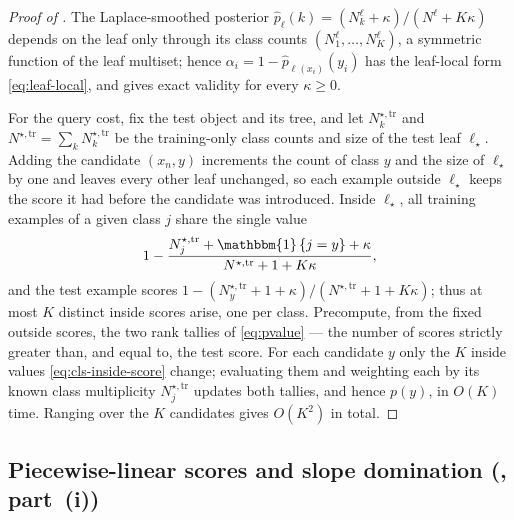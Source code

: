 \documentclass[twoside]{article}
\numberwithin{equation}{section}
\theoremstyle{plain}
\theoremstyle{definition}
\theoremstyle{remark}
\newcommand{\set}[1]{\left\{#1\right\}}
\begin{document}
\begin{proof}[Proof of ]
The Laplace-smoothed posterior $\widehat{p}_{\ell}(k) = (N_k^{\ell} + \kappa)/(N^{\ell} + K\kappa)$
depends on the leaf only through its class counts $(N_1^{\ell}, \dots, N_K^{\ell})$, a
symmetric function of the leaf multiset; hence $\alpha_i = 1 - \widehat{p}_{\ell(x_i)}(y_i)$
has the leaf-local form \eqref{eq:leaf-local}, and  gives exact
validity for every $\kappa \ge 0$.

For the query cost, fix the test object and its tree, and let $N_k^{\star,\mathrm{tr}}$ and
$N^{\star,\mathrm{tr}} = \sum_k N_k^{\star,\mathrm{tr}}$ be the training-only class counts
and size of the test leaf $\ell_\star$. Adding the candidate $(x_n, y)$ increments the
count of class $y$ and the size of $\ell_\star$ by one and leaves every other leaf
unchanged, so each example outside $\ell_\star$ keeps the score it had before the
candidate was introduced. Inside $\ell_\star$, all training examples of a given class $j$
share the single value
\begin{equation}\label{eq:cls-inside-score}
  1 - \frac{N_j^{\star,\mathrm{tr}} + \mathbbm{1}\set{j = y} + \kappa}
           {N^{\star,\mathrm{tr}} + 1 + K\kappa},
\end{equation}
and the test example scores $1 - (N_y^{\star,\mathrm{tr}} + 1 + \kappa)/(N^{\star,\mathrm{tr}} + 1 + K\kappa)$;
thus at most $K$ distinct inside scores arise, one per class. Precompute, from the fixed
outside scores, the two rank tallies of \eqref{eq:pvalue} --- the number of scores
strictly greater than, and equal to, the test score. For each candidate $y$ only the $K$
inside values \eqref{eq:cls-inside-score} change; evaluating them and weighting each by
its known class multiplicity $N_j^{\star,\mathrm{tr}}$ updates both tallies, and hence
$p(y)$, in $O(K)$ time. Ranging over the $K$ candidates gives $O(K^2)$ in total.
\end{proof}

\subsection{Piecewise-linear scores and slope domination (, part~(i))}\label{app:reg-pwl}
\end{document}
